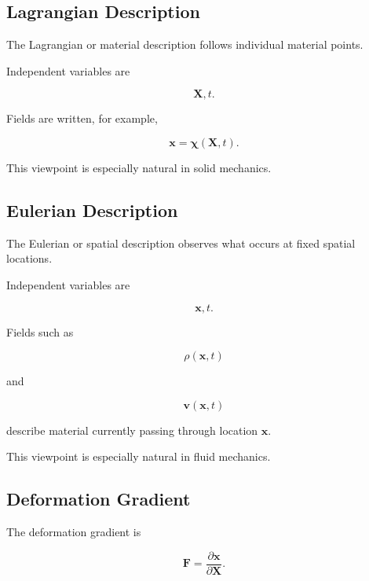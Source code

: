 \subsection{Lagrangian Description}
\label{subsec:lagrangian-description-continuum}

The Lagrangian or material description follows individual material points.

Independent variables are

\[
\boxed{
\mathbf{X},t.
}
\]

Fields are written, for example,

\[
\boxed{
\mathbf{x}
=
\boldsymbol{\chi}(\mathbf{X},t).
}
\]

This viewpoint is especially natural in solid mechanics.

\subsection{Eulerian Description}
\label{subsec:eulerian-description-continuum}

The Eulerian or spatial description observes what occurs at fixed spatial
locations.

Independent variables are

\[
\boxed{
\mathbf{x},t.
}
\]

Fields such as

\[
\boxed{
\rho(\mathbf{x},t)
}
\]

and

\[
\boxed{
\mathbf{v}(\mathbf{x},t)
}
\]

describe material currently passing through location \(\mathbf{x}\).

This viewpoint is especially natural in fluid mechanics.

\subsection{Deformation Gradient}
\label{subsec:deformation-gradient}

The deformation gradient is

\[
\boxed{
\mathbf{F}
=
\frac{\partial\mathbf{x}}
{\partial\mathbf{X}}.
}
\]

